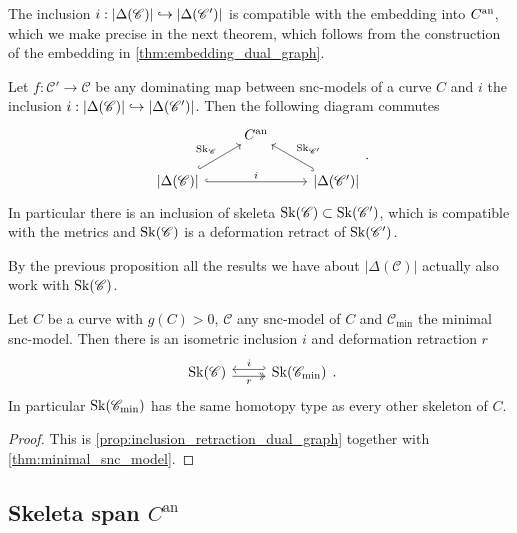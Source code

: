 The inclusion $i: |\Delta(\mathscr C)| \hookrightarrow |\Delta(\mathscr C')|$ is compatible with the embedding into $C{}^{\text{an}}$, which we make precise in the next theorem, which follows from the construction of the embedding in \cref{thm:embedding_dual_graph}.
\begin{proposition}
	Let $f:\mathscr C' \to \mathscr C$ be any dominating map between snc-models of a curve $C$ and $i$ the inclusion $i: |\Delta(\mathscr C)| \hookrightarrow |\Delta(\mathscr C')|$. 
	Then the following diagram commutes \[
	\begin{tikzcd}
		& C\an \\
		{|\Delta(\mathscr C)|} \ar[hookrightarrow]{ur}{\sk_{\mathscr C}}
\ar[hookrightarrow]{rr}{i} & & {|\Delta(\mathscr C')|} \ar[hookrightarrow]{ul}[']{\sk_{\mathscr C'}}
	\end{tikzcd}
	.\] 
	In particular there is an inclusion of skeleta $\operatorname{Sk}(\mathscr C) \subset  \operatorname{Sk}(\mathscr C')$, which is compatible with the metrics and $\operatorname{Sk}(\mathscr C)$ is a deformation retract of  $\operatorname{Sk}(\mathscr C')$. 
\end{proposition}

By the previous proposition all the results we have about $|\Delta(\mathscr C)|$ actually also work with  $\operatorname{Sk}(\mathscr C)$. 

\begin{corollary}
	Let $C$ be a curve with  $g(C) > 0$, $\mathscr C$ any snc-model of $C$ and $\mathscr C_\text{min} $ the minimal snc-model. 
	Then there is an isometric inclusion $i$ and deformation retraction $r$
\[
\begin{tikzcd}
	\sk(\mathscr C ) \rar[hookleftarrow, shift left]{i} \rar[twoheadrightarrow, shift right, ']{r} & \sk(\mathscr C_\text{min} ) 
\end{tikzcd}
.\] 
In particular $\operatorname{Sk}(\mathscr C_\text{min} )$ has the same homotopy type as every other skeleton of $C$. 
\end{corollary}
\begin{proof}
	This is \cref{prop:inclusion_retraction_dual_graph} together with \cref{thm:minimal_snc_model}.
\end{proof}

\subsection{Skeleta span $C^{\mathrm{an}}$} \label{sec:skeleta_span_C_an}


